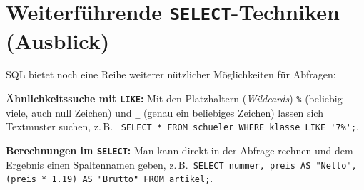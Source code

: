 \clearpage

\rehead[]{\textcolor{lightblue}{AvHG, Inf, My}}
\lohead[]{\textcolor{lightblue}{AvHG, Inf, My}}

\section{Weiterführende \texttt{SELECT}-Techniken (Ausblick) \tagZusatz \tagLK}

SQL bietet noch eine Reihe weiterer nützlicher Möglichkeiten für Abfragen:

\begin{compactitem}
  \item \textbf{Ähnlichkeitssuche mit \lstinline|LIKE|:} Mit den Platzhaltern
  (\emph{Wildcards}) \lstinline|%| (beliebig viele, auch null Zeichen) \linebreak 
  und \lstinline|_| (genau ein beliebiges Zeichen) lassen sich Textmuster suchen,
  z.\,B.\ \linebreak
  \lstinline|SELECT * FROM schueler WHERE klasse LIKE '7%';|.
  \item \textbf{Berechnungen im \lstinline|SELECT|:} Man kann direkt in der
  Abfrage rechnen und dem Ergebnis einen Spaltennamen geben, z.\,B.\
  \lstinline|SELECT nummer, preis AS "Netto", (preis * 1.19) AS "Brutto" FROM artikel;|.
\end{compactitem}

